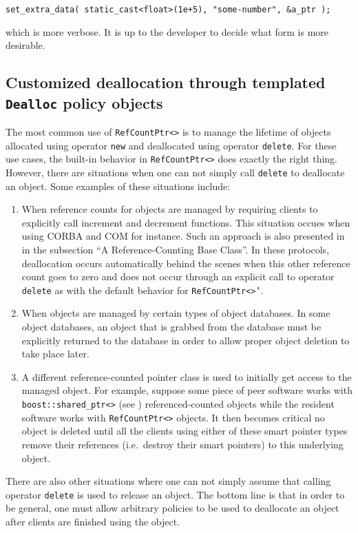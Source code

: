 {\scriptsize\begin{verbatim}
set_extra_data( static_cast<float>(1e+5), "some-number", &a_ptr );
\end{verbatim}}

{}\noindent{}which is more verbose.  It is up to the developer to
decide what form is more desirable.

%
\subsection{Customized deallocation through templated {}\texttt{Dealloc} policy objects}
\label{rcp:sec:dealloc}
%

The most common use of {}\texttt{Ref\-Count\-Ptr<>} is to manage the
lifetime of objects allocated using operator {}\texttt{new} and
deallocated using operator {}\texttt{delete}.  For these use cases,
the built-in behavior in {}\texttt{Ref\-Count\-Ptr<>} does exactly the
right thing.  However, there are situations when one can not simply
call {}\texttt{delete} to deallocate an object.  Some examples of
these situations include:
%
\begin{enumerate}
\item
When reference counts for objects are managed by requiring clients to
explicitly call increment and decrement functions.  This situation
occues when using CORBA {}\cite{ref:corba} and COM {}\cite{ref:com}
for instance.  Such an approach is also presented in {}\cite[Item
29]{ref:meyers_1996} in the subsection ``A Reference-Counting Base
Class''.  In these protocols, deallocation occurs automatically behind
the scenes when this other reference count goes to zero and does not
occur through an explicit call to operator {}\texttt{delete} as with
the default behavior for {}\texttt{Ref\-Count\-Ptr<>'}.
\item
When objects are managed by certain types of object databases.  In
some object databases, an object that is grabbed from the database must
be explicitly returned to the database in order to allow proper object
deletion to take place later.
\item
A different reference-counted pointer class is used to initially get
access to the managed object.  For example, suppose some piece of peer
software works with {}\texttt{boost::shared\_ptr<>} (see
{}\cite{ref:boost}) referenced-counted objects while the resident
software works with {}\texttt{Ref\-Count\-Ptr<>} objects.  It then
becomes critical no object is deleted until all the clients using
either of these smart pointer types remove their references
(i.e.~destroy their smart pointers) to this underlying object.
\end{enumerate}
%
There are also other situations where one can not simply assume that
calling operator {}\texttt{delete} is used to release an object.  The
bottom line is that in order to be general, one must allow arbitrary
policies to be used to deallocate an object after clients are finished
using the object.

